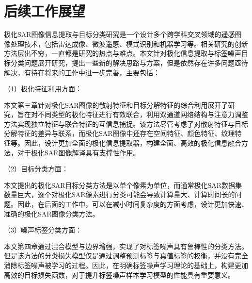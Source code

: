 

\section{后续工作展望}

极化SAR图像信息提取与目标分类研究是一个设计多个跨学科交叉领域的遥感图像处理技术，包括雷达成像、微波遥感、模式识别和机器学习等。相关研究的创新方法层出不穷，一直都是研究的热点与难点。本文针对极化信息提取与标签噪声目标分类问题展开研究，提出一些新的解决思路与方案，但是依然存在许多问题亟待解决，有待在将来的工作中进一步完善，主要包括：

（1）极化特征利用方面：

本文第三章针对极化SAR图像的散射特征和目标分解特征的综合利用展开了研究，旨在对不同类型的极化特征进行有效联合，利用双通道网络结构与注意力调整方法实现独立特征与联合特征的互信息捕捉。该方法尽管考虑了对散射特征与目标分解特征的差异与联系，而极化SAR图像中还存在空间特征、颜色特征、纹理特征等。因此，设计更加全面的极化信息提取器，构建全面、高效的极化信息融合方法，对于极化SAR图像解译具有支撑性作用。

（2）目标分类方面：

本文提出的极化SAR目标分类方法是以单个像素为单位，而通常极化SAR数据集数量巨大，逐个对极化SAR像素进行分类可能会导致计算量大、计算时间长的问题。因此，在后面的工作中，可以在减小时间复杂度的方面考虑，设计更加快速、准确的极化SAR图像分类方法。

（3）噪声标签分类方面：

本文第四章通过混合模型与边界增强，实现了对标签噪声具有鲁棒性的分类方法。但是该方法的分类损失模型仅是通过调整预测标签与真值标签的权衡，并没有完全消除标签噪声被学习的过程。因此，在明确标签噪声学习理论的基础上，构建更加高效的目标损失函数，对于提升标签噪声样本学习模型的性能具有重要意义。


